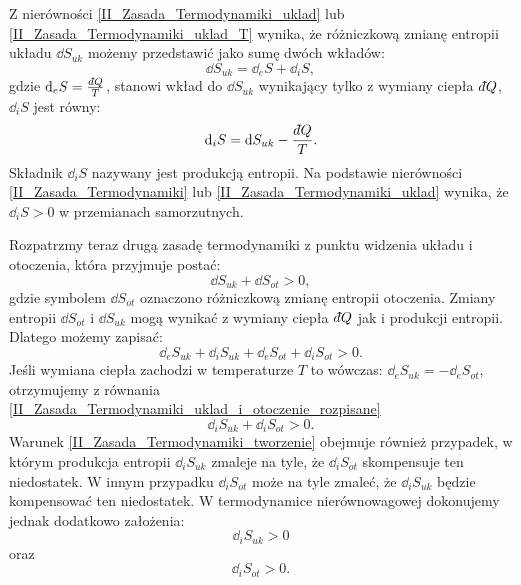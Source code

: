 \documentclass[10pt, a4paper, twoside, onecolumn]{article}
\numberwithin{equation}{section}
\newcommand{\dbar}{d\hspace*{-0.08em}\bar{}\hspace*{0.1em}}
\begin{document}
	Z nierówności \eqref{II_Zasada_Termodynamiki_uklad} lub \eqref{II_Zasada_Termodynamiki_uklad_T} wynika, że różniczkową zmianę entropii układu \(\dd{S_{uk}}\) możemy przedstawić jako sumę dwóch wkładów:
	\begin{equation}
		\dd{S_{uk}}=\dd_{e}S+\dd_{i}S,
	\end{equation}
	gdzie \(\dd_{e}S=\frac{\dbar Q}{T}\), stanowi wkład do \(\dd{S_{uk}}\) wynikający tylko z wymiany ciepła \(\dbar Q\), \(\dd_{i}S\) jest równy:
	\begin{equation}
		\dd_{i}S=\dd{S_{uk}}-\frac{\dbar Q}{T}.
	\end{equation}
	Składnik \(\dd_{i}S\) nazywany jest produkcją entropii. Na podstawie nierówności \eqref{II_Zasada_Termodynamiki} lub \eqref{II_Zasada_Termodynamiki_uklad} wynika, że \(\dd_{i}S>0\) w przemianach samorzutnych. \par
	Rozpatrzmy teraz drugą zasadę termodynamiki z punktu widzenia układu i otoczenia, która przyjmuje postać:
	\begin{equation}\label{II_Zasada_Termodynamiki_uklad_i_otoczenie}
		\dd{S_{uk}}+\dd{S_{ot}}>0,
	\end{equation}
	gdzie symbolem \(\dd{S_{ot}}\) oznaczono różniczkową zmianę entropii otoczenia. Zmiany entropii \(\dd{S_{ot}}\) i \(\dd{S_{uk}}\) mogą wynikać z wymiany ciepła \(\dbar Q\) jak i produkcji entropii. Dlatego możemy zapisać:
	\begin{equation}\label{II_Zasada_Termodynamiki_uklad_i_otoczenie_rozpisane}
		\dd_{e}S_{uk}+\dd_{i}S_{uk}+\dd_{e}S_{ot}+\dd_{i}S_{ot}>0.
	\end{equation}
	Jeśli wymiana ciepła zachodzi w temperaturze \(T\) to wówczas: \(\dd_{e}S_{uk}=-\dd_{e}S_{ot}\), otrzymujemy z równania \eqref{II_Zasada_Termodynamiki_uklad_i_otoczenie_rozpisane} 
	\begin{equation}\label{II_Zasada_Termodynamiki_tworzenie}
		\dd_{i}S_{uk}+\dd_{i}S_{ot}>0.
	\end{equation}
	Warunek \eqref{II_Zasada_Termodynamiki_tworzenie} obejmuje również przypadek, w którym produkcja entropii \(\dd_{i}S_{uk}\) zmaleje na tyle, że \(\dd_{i}S_{ot}\) skompensuje ten niedostatek. W innym przypadku \(\dd_{i}S_{ot}\) może na tyle zmaleć, że \(\dd_{i}S_{uk}\) będzie kompensować ten niedostatek. W termodynamice nierównowagowej dokonujemy jednak dodatkowo założenia:
	\begin{equation*}
		\dd_{i}S_{uk}>0
	\end{equation*}
	oraz
	\begin{equation*}
		\dd_{i}S_{ot}>0.
	\end{equation*}
	
\end{document}
